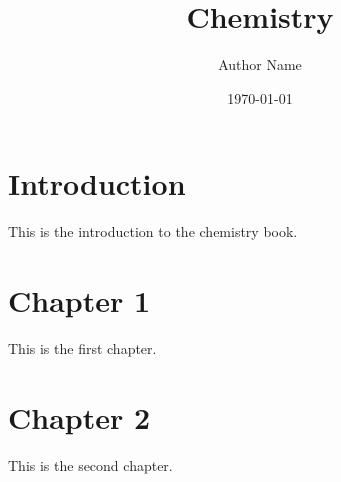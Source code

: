 \documentclass{book}
\begin{document}
\title{Chemistry}
\author{Author Name}
\date{\today}

\maketitle

\tableofcontents

\chapter{Introduction}
This is the introduction to the chemistry book.

\chapter{Chapter 1}
This is the first chapter.

\chapter{Chapter 2}
This is the second chapter.
\end{document}
